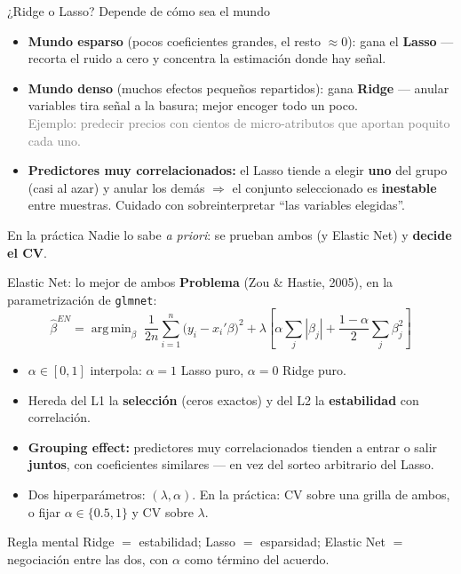 \documentclass{beamer}
\newcommand{\1}{\mathbb{I}}
\DeclareMathOperator*{\argmin}{arg\,min}
\begin{document}
\begin{frame}{¿Ridge o Lasso? Depende de cómo sea el mundo}
\small
\begin{itemize}\itemsep6pt
  \item \textbf{Mundo esparso} (pocos coeficientes grandes, el resto $\approx 0$): gana el \textbf{Lasso} --- recorta el ruido a cero y concentra la estimación donde hay señal. \pause
  \item \textbf{Mundo denso} (muchos efectos pequeños repartidos): gana \textbf{Ridge} --- anular variables tira señal a la basura; mejor encoger todo un poco. \\ \textcolor{gray}{Ejemplo: predecir precios con cientos de micro-atributos que aportan poquito cada uno.} \pause
  \item \textbf{Predictores muy correlacionados:} el Lasso tiende a elegir \textbf{uno} del grupo (casi al azar) y anular los demás $\Rightarrow$ el conjunto seleccionado es \textbf{inestable} entre muestras. Cuidado con sobreinterpretar ``las variables elegidas''. \pause
\end{itemize}

\vspace{0.1cm}
\begin{block}{En la práctica}
Nadie lo sabe \emph{a priori}: se prueban ambos (y Elastic Net) y \textbf{decide el CV}.
\end{block}
\end{frame}

\begin{frame}{Elastic Net: lo mejor de ambos}
\small
\textbf{Problema} (Zou \& Hastie, 2005), en la parametrización de \texttt{glmnet}:
\[ \hat{\beta}^{EN} = \argmin_{\beta} \; \frac{1}{2n}\sum_{i=1}^n \big(y_i - x_i'\beta\big)^2 + \lambda \left[ \alpha \sum_j |\beta_j| + \frac{1-\alpha}{2} \sum_j \beta_j^2 \right] \]
\pause

\begin{itemize}\itemsep5pt
  \item $\alpha \in [0,1]$ interpola: $\alpha = 1$ Lasso puro, $\alpha = 0$ Ridge puro.
  \item Hereda del L1 la \textbf{selección} (ceros exactos) y del L2 la \textbf{estabilidad} con correlación.
  \item \textbf{Grouping effect:} predictores muy correlacionados tienden a entrar o salir \textbf{juntos}, con coeficientes similares --- en vez del sorteo arbitrario del Lasso. \pause
  \item Dos hiperparámetros: $(\lambda, \alpha)$. En la práctica: CV sobre una grilla de ambos, o fijar $\alpha \in \{0.5, 1\}$ y CV sobre $\lambda$.
\end{itemize}
\pause

\begin{block}{Regla mental}
Ridge $=$ estabilidad; Lasso $=$ esparsidad; Elastic Net $=$ negociación entre las dos, con $\alpha$ como término del acuerdo.
\end{block}
\end{frame}
\end{document}
